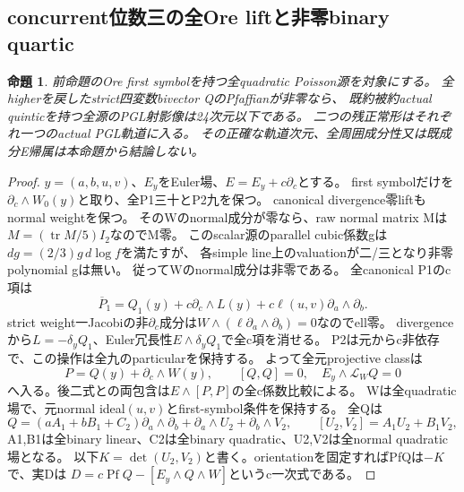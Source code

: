 \documentclass[a4paper,11pt]{ltjsarticle}
\newtheorem{proposition}{命題}[section]
\theoremstyle{definition}
\begin{document}
\subsection{concurrent位数三の全Ore liftと非零binary quartic}
\begin{proposition}\label{prop:plane-concurrent-m3-nonzero-quartic-G}
前命題のOre first symbolを持つ全quadratic Poisson源を対象にする。
全higherを戻したstrict四変数bivector QのPfaffianが非零なら、
既約被約actual quinticを持つ全源のPGL射影像は24次元以下である。
二つの残正常形はそれぞれ一つのactual PGL軌道に入る。
その正確な軌道次元、全周囲成分性又は既成分E帰属は本命題から結論しない。
\end{proposition}
\begin{proof}
$y=(a,b,u,v)$、$E_y$をEuler場、$E=E_y+c\partial_c$とする。
first symbolだけを$\partial_c\wedge W_0(y)$と取り、全P1三十とP2九を保つ。
canonical divergence零liftもnormal weightを保つ。
そのWのnormal成分が零なら、raw normal matrix Mは$M=(\operatorname{tr}M/5)I_2$なのでM零。
このscalar源のparallel cubic係数gは$dg=(2/3)g\,d\log f$を満たすが、
各simple line上のvaluationが二/三となり非零polynomial gは無い。
従ってWのnormal成分は非零である。
全canonical P1のc項は
\[
 \overline P_1=Q_1(y)+c\partial_c\wedge L(y)+c\ell(u,v)\partial_a\wedge\partial_b.
\]
strict weight一Jacobiの非$\partial_c$成分は$W\wedge(\ell\partial_a\wedge\partial_b)=0$なのでell零。
divergenceから$L=-\delta_yQ_1$、Euler冗長性$E\wedge\delta_yQ_1$で全c項を消せる。
P2は元からc非依存で、この操作は全九のparticularを保持する。
よって全元projective classは
\[
 P=Q(y)+\partial_c\wedge W(y),\qquad
 [Q,Q]=0,\quad E_y\wedge\mathcal L_WQ=0
\]
へ入る。後二式との両包含は$E\wedge[P,P]$の全c係数比較による。
Wは全quadratic場で、元normal ideal$(u,v)$とfirst-symbol条件を保持する。
全Qは
\[
 Q=(aA_1+bB_1+C_2)\partial_a\wedge\partial_b
       +\partial_a\wedge U_2+\partial_b\wedge V_2,
 \qquad[U_2,V_2]=A_1U_2+B_1V_2,
\]
A1,B1は全binary linear、C2は全binary quadratic、U2,V2は全normal quadratic場となる。
以下$K=\det(U_2,V_2)$と書く。orientationを固定すればPfQは$-K$で、実Dは
$D=c\operatorname{Pf}Q-[E_y\wedge Q\wedge W]$というc一次式である。


\end{proof}
\end{document}
